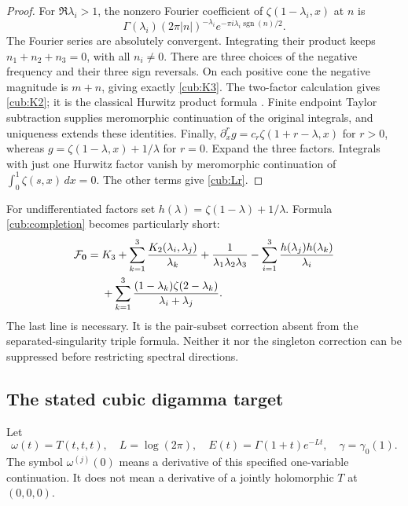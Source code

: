 \documentclass[11pt,a4paper]{article}
\theoremstyle{definition}
\theoremstyle{remark}
\numberwithin{equation}{section}
\begin{document}
\begin{proof}
For $\Re\lambda_i>1$, the nonzero Fourier coefficient of
$\zeta(1-\lambda_i,x)$ at $n$ is
\[
 \Gamma(\lambda_i)(2\pi|n|)^{-\lambda_i}
              e^{-\pi i\lambda_i\operatorname{sgn}(n)/2}.
\]
The Fourier series are absolutely convergent.  Integrating their
product keeps $n_1+n_2+n_3=0$, with all $n_i\ne0$.
There are three choices of the negative frequency and their three
sign reversals.  On each positive cone the negative magnitude is
$m+n$, giving exactly \eqref{cub:K3}.  The two-factor calculation
gives \eqref{cub:K2}; it is the classical Hurwitz product formula
\cite{EM2002}.  Finite endpoint Taylor subtraction supplies
meromorphic continuation of the original integrals, and uniqueness
extends these identities.  Finally,
$\partial_x^r g=c_r\zeta(1+r-\lambda,x)$ for $r>0$, whereas
$g=\zeta(1-\lambda,x)+1/\lambda$ for $r=0$.
Expand the three factors.  Integrals with just one Hurwitz factor
vanish by meromorphic continuation of
$\int_0^1\zeta(s,x)\,dx=0$.  The other terms give \eqref{cub:Lr}.
\end{proof}

For undifferentiated factors set
$h(\lambda)=\zeta(1-\lambda)+1/\lambda$.  Formula
\eqref{cub:completion} becomes particularly short:
\begin{align}
 \mathcal F_{\boldsymbol0}={}&K_3+
   \sum_{k=1}^3\frac{K_2(\lambda_i,\lambda_j)}{\lambda_k}
   +\frac{1}{\lambda_1\lambda_2\lambda_3}
   -\sum_{i=1}^3\frac{h(\lambda_j)h(\lambda_k)}{\lambda_i}
       \notag\\
 &+\sum_{k=1}^3\frac{(1-\lambda_k)\zeta(2-\lambda_k)}
                              {\lambda_i+\lambda_j}.
 \label{cub:Fexplicit}
\end{align}
The last line is necessary.  It is the pair-subset correction absent
from the separated-singularity triple formula.  Neither it nor the
singleton correction can be suppressed before restricting spectral
directions.

\subsection{The stated cubic digamma target}

Let
\[
 \omega(t)=T(t,t,t),\quad L=\log(2\pi),\quad
 E(t)=\Gamma(1+t)e^{-Lt},\quad
 \gamma=\gamma_0(1).
\]
The symbol $\omega^{(j)}(0)$ means a derivative of this specified
one-variable continuation.  It does not mean a derivative of a
jointly holomorphic $T$ at $(0,0,0)$.
\end{document}
